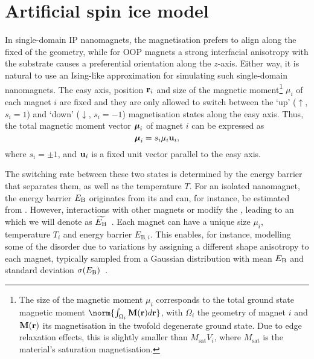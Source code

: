 \newpage
\section{Artificial spin ice model}
In single-domain IP nanomagnets, the magnetisation prefers to align along the fixed  of the geometry, while for OOP magnets a strong interfacial anisotropy with the substrate causes a preferential orientation along the $z$-axis.
Either way, it is natural to use an Ising-like approximation for simulating such single-domain nanomagnets.
The easy axis, position $\boldsymbol{\mathbf{r}}_i$ and size of the magnetic moment\footnote{
	\label{fn:2:moment_integral}
	The size of the magnetic moment $\mu_i$ corresponds to the total ground state magnetic moment $\norm{\int_{\Omega_i} \vc{M}(\vc{r})d\vc{r}}$, with $\Omega_i$ the geometry of magnet $i$ and $\boldsymbol{\mathbf{M}}(\boldsymbol{\mathbf{r}})$ its magnetisation in the twofold degenerate ground state.
	Due to edge relaxation effects, this is slightly smaller than $M_\mathrm{sat} V_i$, where $M_\mathrm{sat}$ is the material's saturation magnetisation.
} $\mu_i$ of each magnet $i$ are fixed and they are only allowed to switch between the `up' ($\uparrow$, $s_i=1$) and `down' ($\downarrow$, $s_i=-1$) magnetisation states along the easy axis.
Thus, the total magnetic moment vector $\boldsymbol{\mathbf{\mu}}_i$ of magnet $i$ can be expressed as
\begin{equation}
	\boldsymbol{\mathbf{\mu}}_i = s_i \mu_i \boldsymbol{\mathbf{u}}_i \mathrm{,}
\end{equation}
where $s_i = \pm 1$, and $\boldsymbol{\mathbf{u}}_i$ is a fixed unit vector parallel to the easy axis. \par
The switching rate between these two states is determined by the energy barrier that separates them, as well as the temperature $T$. %
For an isolated nanomagnet, the energy barrier $E_\mathrm{B}$ originates from its  and can, for instance, be estimated from .
However, interactions with other magnets or  modify the , leading to an  which we will denote as $\widetilde{E_\mathrm{B}}$~\cite{leo2021chiral}.
Each magnet can have a unique  size $\mu_i$, temperature $T_i$ and energy barrier $E_{\mathrm{B},i}$.
This enables, for instance, modelling some of the disorder due to  variations by assigning a different shape anisotropy to each magnet, typically sampled from a Gaussian distribution with mean $E_\mathrm{B}$ and standard deviation $\sigma(E_\mathrm{B})$~\cite{DisorderGroundStateASI}. \\\par

